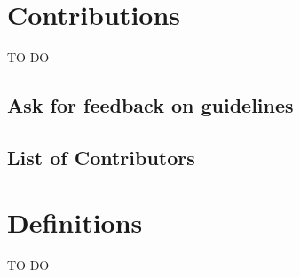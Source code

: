 \documentclass[]{book}
\begin{document}
\hypertarget{contributions}{%
\chapter{Contributions}\label{contributions}}

TO DO

\hypertarget{ask-for-feedback-on-guidelines}{%
\section{Ask for feedback on guidelines}\label{ask-for-feedback-on-guidelines}}

\hypertarget{list-of-contributors}{%
\section{List of Contributors}\label{list-of-contributors}}

\hypertarget{definitions}{%
\chapter{Definitions}\label{definitions}}

TO DO


\end{document}
